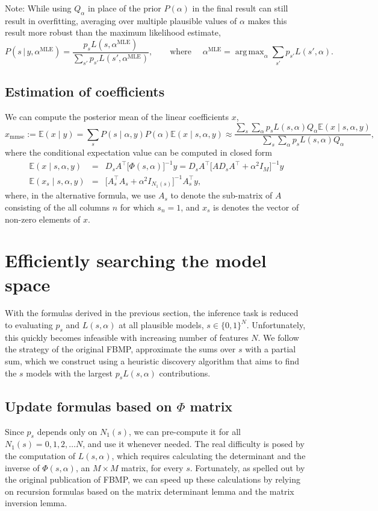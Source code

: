 \documentclass[letter,10pt,oneside]{article}
\DeclareMathOperator*{\amax}{arg\,max}
\newcommand{\be}{\begin{equation*}}
\newcommand{\ee}{\end{equation*}}
\newcommand{\ba}{\begin{eqnarray*}}
\newcommand{\ea}{\end{eqnarray*}}
\newcommand{\+}{^\dagger}
\newcommand{\T}{^\top}
\begin{document}
Note: While using $Q_\alpha$ in place of the prior $P(\alpha)$ in the final result can still result in overfitting, averaging over multiple plausible values of $\alpha$ makes this result more robust than the maximum likelihood estimate,
\be
  P(s\,|\,y,\alpha^\text{MLE}) = \frac{p_s L(s, \alpha^\text{MLE})}{\sum_{s'} p_{s'}L(s', \alpha^\text{MLE})},\qquad \text{where }\quad \alpha^\text{MLE} = \amax_\alpha \sum_{s'}p_{s'}L(s', \alpha).
\ee

\subsection{Estimation of coefficients}
We can compute the posterior mean of the linear coefficients $x$,
\be
  x_\text{mmse} := \mathbb{E}(x\;|\;y) = \sum_s P(s\;|\;\alpha, y) P(\alpha) \mathbb{E}(x\;|\;s, \alpha, y) \approx \frac{\sum_s \sum_\alpha p_{s} L(s, \alpha) Q_\alpha \mathbb{E}(x\;|\;s, \alpha, y)}{\sum_s \sum_\alpha p_{s} L(s, \alpha) Q_\alpha},
\ee
where the conditional expectation value can be computed in closed form
\ba
  \mathbb{E}(x\;|\;s, \alpha, y) &=& D_s A\T \big[\Phi(s, \alpha)\big]^{-1} y 
  = D_s A\T\big[AD_s A\T + \alpha^2 I_M\big]^{-1}y \\
  \mathbb{E}(x_s\;|\;s, \alpha, y) &=& \big[A_s\T A_s + \alpha^2 I_{N_1(s)}\big]^{-1}A_s\T y,
\ea
where, in the alternative formula, we use $A_s$ to denote the sub-matrix of $A$ consisting of the all columns $n$ for which $s_n = 1$, and $x_s$ is denotes the vector of non-zero elements of $x$.

\newpage
\section{Efficiently searching the model space}
\label{sec:Efficient_search}
With the formulas derived in the previous section, the inference task is reduced to evaluating $p_s$ and $L(s,\alpha)$ at all plausible models, $s\in \{0,1\}^N$. Unfortunately, this quickly becomes infeasible with increasing number of features $N$. We follow the strategy of the original FBMP, approximate the sums over $s$ with a partial sum, which we construct using a heuristic discovery algorithm that aims to find the $s$ models with the largest $p_s L(s, \alpha)$ contributions.

\subsection{Update formulas based on $\Phi$ matrix}
Since $p_s$ depends only on $N_1(s)$, we can pre-compute it for all $N_1(s) = 0, 1, 2, \ldots N$, and use it whenever needed. The real difficulty is posed by the computation of $L(s, \alpha)$, which requires calculating the determinant and the inverse of $\Phi(s,\alpha)$, an $M\times M$ matrix, for every $s$. Fortunately, as spelled out by the original publication of FBMP, we can speed up these calculations by relying on recursion formulas based on the matrix determinant lemma and the matrix inversion lemma.
\end{document}
